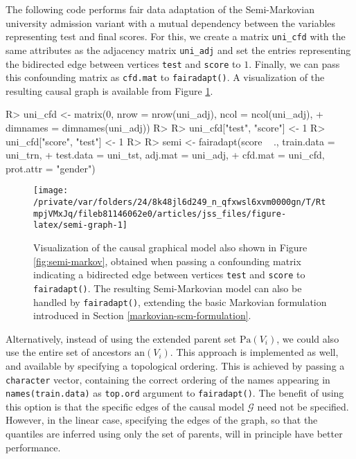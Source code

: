 \documentclass[
  nojss]{jss}
\begin{document}
The following code performs fair data adaptation of the Semi-Markovian
university admission variant with a mutual dependency between the
variables representing test and final scores. For this, we create a
matrix \texttt{uni\_cfd} with the same attributes as the adjacency
matrix \texttt{uni\_adj} and set the entries representing the bidirected
edge between vertices \texttt{test} and \texttt{score} to \(1\).
Finally, we can pass this confounding matrix as \texttt{cfd.mat} to
\texttt{fairadapt()}. A visualization of the resulting causal graph is
available from Figure \ref{fig:semi-graph}.

\begin{CodeChunk}
\begin{CodeInput}
R> uni_cfd <- matrix(0, nrow = nrow(uni_adj), ncol = ncol(uni_adj),
+                   dimnames = dimnames(uni_adj))
R> 
R> uni_cfd["test", "score"] <- 1
R> uni_cfd["score", "test"] <- 1
R> 
R> semi <- fairadapt(score ~ ., train.data = uni_trn,
+                   test.data = uni_tst, adj.mat = uni_adj,
+                   cfd.mat = uni_cfd, prot.attr = "gender")
\end{CodeInput}
\end{CodeChunk}

\begin{CodeChunk}
\begin{figure}

{\centering \texttt{[image: /private/var/folders/24/8k48jl6d249\_n\_qfxwsl6xvm0000gn/T/RtmpjVMxJq/fileb81146062e0/articles/jss\_files/figure-latex/semi-graph-1]} 

}

\caption{Visualization of the causal graphical model also shown in Figure \ref{fig:semi-markov}, obtained when passing a confounding matrix indicating a bidirected edge between vertices \texttt{test} and \texttt{score} to \texttt{fairadapt()}. The resulting Semi-Markovian model can also be handled by \texttt{fairadapt()}, extending the basic Markovian formulation introduced in Section \ref{markovian-scm-formulation}.}\label{fig:semi-graph}
\end{figure}
\end{CodeChunk}

Alternatively, instead of using the extended parent set
\(\mathrm{Pa}(V_i)\), we could also use the entire set of ancestors
\(\mathrm{an}(V_i)\). This approach is implemented as well, and
available by specifying a topological ordering. This is achieved by
passing a \texttt{character} vector, containing the correct ordering of
the names appearing in \texttt{names(train.data)} as \texttt{top.ord}
argument to \texttt{fairadapt()}. The benefit of using this option is
that the specific edges of the causal model \(\mathcal{G}\) need not be
specified. However, in the linear case, specifying the edges of the
graph, so that the quantiles are inferred using only the set of parents,
will in principle have better performance.
\end{document}
